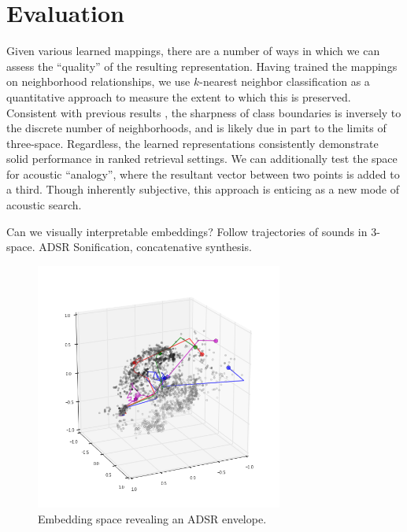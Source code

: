 \documentclass{article}
\begin{document}
\section{Evaluation}

Given various learned mappings, there are a number of ways in which we can assess the ``quality'' of the resulting representation.
Having trained the mappings on neighborhood relationships, we use $k$-nearest neighbor classification as a quantitative approach to measure the extent to which this is preserved.
Consistent with previous results \cite{humphrey2011nlse, humphrey2015dl4mir}, the sharpness of class boundaries is inversely to the discrete number of neighborhoods, and is likely due in part to the limits of three-space.
Regardless, the learned representations consistently demonstrate solid performance in ranked retrieval settings.
We can additionally test the space for acoustic ``analogy'', where the resultant vector between two points is added to a third.
Though inherently subjective, this approach is enticing as a new mode of acoustic search.

Can we visually interpretable embeddings?
Follow trajectories of sounds in 3-space.
ADSR
Sonification, concatenative synthesis.



\begin{figure}[!t]
\begin{center}
\centerline{\includegraphics[width=3.2in]{inst-pitch-d2_adsr.png}}
\caption{Embedding space revealing an ADSR envelope.}
\label{icml-historical}
\end{center}
\end{figure}
\end{document}
